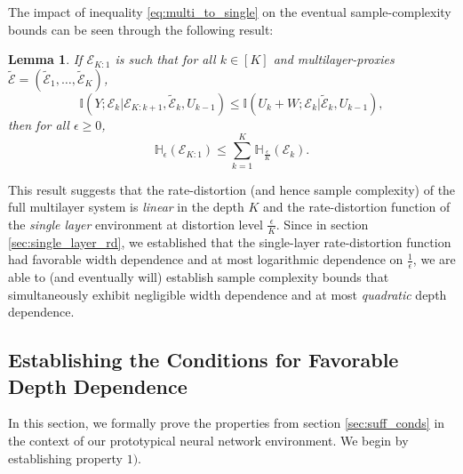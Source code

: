 \documentclass[twoside,11pt]{article}
\newtheorem{lemma}[theorem]{Lemma}
\def\environment{\mathcal{E}}
\def\proxy{\tilde{\environment}}
\def\H{\mathbb{H}}
\def\I{\mathbb{I}}
\begin{document}
The impact of inequality \ref{eq:multi_to_single} on the eventual sample-complexity bounds can be seen through the following result:

\begin{lemma}
    If $\environment_{K:1}$ is such that for all $k \in [K]$ and multilayer-proxies $\proxy = (\proxy_1, \hdots, \proxy_K)$,
    $$\I(Y;\environment_k|\environment_{K:k+1}, \proxy_k, U_{k-1})\leq \I(U_k+W;\environment_k|\proxy_k, U_{k-1}),$$
    then for all $\epsilon \geq 0$,
    $$\H_{\epsilon}(\environment_{K:1}) \leq \sum_{k=1}^{K}\H_{\frac{\epsilon}{K}}(\environment_k).$$
\end{lemma}

This result suggests that the rate-distortion (and hence sample complexity) of the full multilayer system is \emph{linear} in the depth $K$ and the rate-distortion function of the \emph{single layer} environment at distortion level $\frac{\epsilon}{K}$. Since in section \ref{sec:single_layer_rd}, we established that the single-layer rate-distortion function had favorable width dependence and at most logarithmic dependence on $\frac{1}{\epsilon}$, we are able to (and eventually will) establish sample complexity bounds that simultaneously exhibit negligible width dependence and at most \emph{quadratic} depth dependence.

\subsection{Establishing the Conditions for Favorable Depth Dependence}
In this section, we formally prove the properties from section \ref{sec:suff_conds} in the context of our prototypical neural network environment.
We begin by establishing property $1)$.
\end{document}
